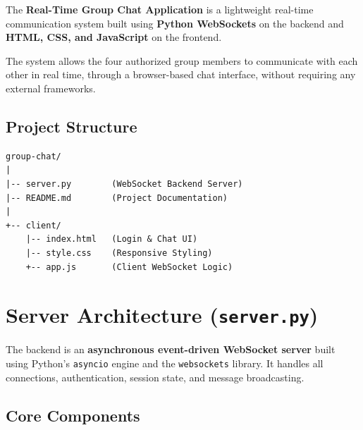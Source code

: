 \documentclass[11pt,a4paper]{article}
\begin{document}
The \textbf{Real-Time Group Chat Application} is a lightweight real-time communication system built using \textbf{Python WebSockets} on the backend and \textbf{HTML, CSS, and JavaScript} on the frontend.

The system allows the four authorized group members to communicate with each other in real time, through a browser-based chat interface, without requiring any external frameworks.

\subsection{Project Structure}

\begin{lstlisting}
group-chat/
|
|-- server.py        (WebSocket Backend Server)
|-- README.md        (Project Documentation)
|
+-- client/
    |-- index.html   (Login & Chat UI)
    |-- style.css    (Responsive Styling)
    +-- app.js       (Client WebSocket Logic)
\end{lstlisting}


\section{Server Architecture (\texttt{server.py})}

The backend is an \textbf{asynchronous event-driven WebSocket server} built using Python's \texttt{asyncio} engine and the \texttt{websockets} library. It handles all connections, authentication, session state, and message broadcasting.

\subsection{Core Components}
\end{document}
